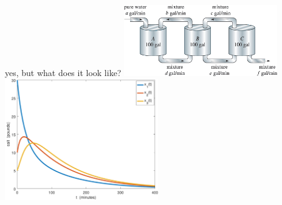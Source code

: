\documentclass[dvipsnames,colorlinks]{beamer}
\begin{document}
\begin{frame}{yes, but what does it look like?}
\vspace{-15mm}
\mbox{\includegraphics[width=0.5\textwidth]{figs/three-tanks}\quad \includegraphics[width=0.5\textwidth]{figs/brines-xvt}}
\end{frame}
\end{document}
